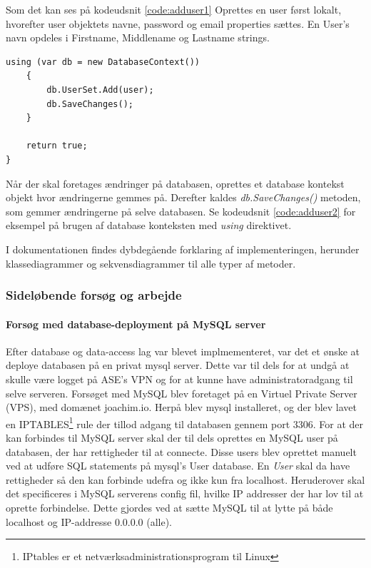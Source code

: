Som det kan ses på kodeudsnit \ref{code:adduser1} Oprettes en user først lokalt, hvorefter user objektets navne, password og email properties sættes. En User's navn opdeles i Firstname, Middlename og Lastname strings. 

\begin{lstlisting}[caption=User objektet tilføjes i database konteksten hvorefter der gemmes på selve databasen,label=code:adduser2]
	using (var db = new DatabaseContext())
	{
		db.UserSet.Add(user);
		db.SaveChanges();
	}

	return true;
}
\end{lstlisting}

Når der skal foretages ændringer på databasen, oprettes et database kontekst objekt hvor ændringerne gemmes på. Derefter kaldes \textit{db.SaveChanges()} metoden, som gemmer ændringerne på selve databasen. Se kodeudsnit \ref{code:adduser2} for eksempel på brugen af database konteksten med \textit{using} direktivet.

I dokumentationen findes dybdegående forklaring af implementeringen, herunder klassediagrammer og sekvensdiagrammer til alle typer af metoder.

\subsubsection{Sideløbende forsøg og arbejde}

\paragraph{Forsøg med database-deployment på MySQL server}
Efter database og data-access lag var blevet implmementeret, var det et ønske at deploye databasen på en privat mysql server. Dette var til dels for at undgå at skulle være logget på ASE's VPN og for at kunne have administratoradgang til selve serveren.
Forsøget med MySQL blev foretaget på en Virtuel Private Server (VPS), med domænet joachim.io. Herpå blev mysql installeret, og der blev lavet en IPTABLES\footnote{IPtables er et netværksadministrationsprogram til Linux} rule der tillod adgang til databasen gennem port 3306. For at der kan forbindes til MySQL server skal der til dels oprettes en MySQL user på databasen, der har rettigheder til at connecte. Disse users blev oprettet manuelt ved at udføre SQL statements på mysql’s User database. En \textit{User} skal da have rettigheder så den kan forbinde udefra og ikke kun fra localhost. Heruderover skal det specificeres i MySQL serverens config fil, hvilke IP addresser der har lov til at oprette forbindelse. Dette gjordes ved at sætte MySQL til at lytte på både localhost og IP-addresse 0.0.0.0 (alle).

